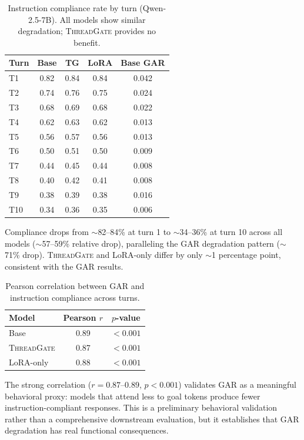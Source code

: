 \documentclass[11pt,a4paper]{article}
\newcommand{\gar}{\textsc{GAR}}
\newcommand{\tg}{\textsc{ThreadGate}}
\begin{document}
\begin{table}[H]
\centering
\caption{Instruction compliance rate by turn (Qwen-2.5-7B). All models show similar degradation; \tg{} provides no benefit.}
\label{tab:compliance}
\begin{tabular}{lcccc}
\toprule
\textbf{Turn} & \textbf{Base} & \textbf{TG} & \textbf{LoRA} & \textbf{Base \gar{}} \\
\midrule
T1  & 0.82 & 0.84 & 0.84 & 0.042 \\
T2  & 0.74 & 0.76 & 0.75 & 0.024 \\
T3  & 0.68 & 0.69 & 0.68 & 0.022 \\
T4  & 0.62 & 0.63 & 0.62 & 0.013 \\
T5  & 0.56 & 0.57 & 0.56 & 0.013 \\
T6  & 0.50 & 0.51 & 0.50 & 0.009 \\
T7  & 0.44 & 0.45 & 0.44 & 0.008 \\
T8  & 0.40 & 0.42 & 0.41 & 0.008 \\
T9  & 0.38 & 0.39 & 0.38 & 0.016 \\
T10 & 0.34 & 0.36 & 0.35 & 0.006 \\
\bottomrule
\end{tabular}
\end{table}

Compliance drops from $\sim$82--84\% at turn 1 to $\sim$34--36\% at turn 10 across all models ($\sim$57--59\% relative drop), paralleling the \gar{} degradation pattern ($\sim$71\% drop).
\tg{} and LoRA-only differ by only $\sim$1 percentage point, consistent with the \gar{} results.

\begin{table}[H]
\centering
\caption{Pearson correlation between \gar{} and instruction compliance across turns.}
\label{tab:compliance-corr}
\begin{tabular}{lcc}
\toprule
\textbf{Model} & \textbf{Pearson $r$} & \textbf{$p$-value} \\
\midrule
Base      & 0.89 & $<0.001$ \\
\tg{}     & 0.87 & $<0.001$ \\
LoRA-only & 0.88 & $<0.001$ \\
\bottomrule
\end{tabular}
\end{table}

The strong correlation ($r = 0.87$--$0.89$, $p < 0.001$) validates \gar{} as a meaningful behavioral proxy: models that attend less to goal tokens produce fewer instruction-compliant responses.
This is a preliminary behavioral validation rather than a comprehensive downstream evaluation, but it establishes that \gar{} degradation has real functional consequences.
\end{document}
